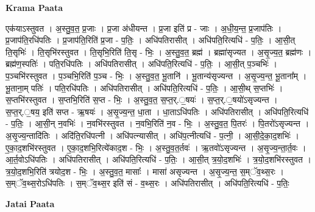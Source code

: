 \documentclass[17pt]{extarticle}
\begin{document}
\textbf{Krama Paata} \newline

एक॑याऽस्तुवत । अ॒स्तु॒व॒त॒ प्र॒जाः । प्र॒जा अ॑धीयन्त । प्र॒जा इति॑ प्र - जाः । अ॒धी॒य॒न्त॒ प्र॒जाप॑तिः । प्र॒जाप॑ति॒रधि॑पतिः । प्र॒जाप॑ति॒रिति॑ प्र॒जा - प॒तिः॒ । अधि॑पतिरासीत् । अधि॑पति॒रित्यधि॑ - प॒तिः॒ । आ॒सी॒त् ति॒सृभिः॑ । ति॒सृभि॑रस्तुवत । ति॒सृभि॒रिति॑ ति॒सृ - भिः॒ । अ॒स्तु॒व॒त॒ ब्रह्म॑ । ब्रह्मा॑सृज्यत । अ॒सृ॒ज्य॒त॒ ब्रह्म॑णः । ब्रह्म॑ण॒स्पतिः॑ । पति॒रधि॑पतिः । अधि॑पतिरासीत् । अधि॑पति॒रित्यधि॑ - प॒तिः॒ । आ॒सी॒त् प॒ञ्चभिः॑ । प॒ञ्चभि॑रस्तुवत । प॒ञ्चभि॒रिति॑ प॒ञ्च - भिः॒ । अ॒स्तु॒व॒त॒ भू॒तानि॑ । भू॒तान्य॑सृज्यन्त । अ॒सृ॒ज्य॒न्त॒ भू॒ताना᳚म् । भू॒ताना॒म् पतिः॑ । पति॒रधि॑पतिः । अधि॑पतिरासीत् । अधि॑पति॒रित्यधि॑ - प॒तिः॒ । आ॒सी॒थ् स॒प्तभिः॑ । स॒प्तभि॑रस्तुवत । स॒प्तभि॒रिति॑ स॒प्त - भिः॒ । अ॒स्तु॒व॒त॒ स॒प्त॒र्.॒षयः॑ । स॒प्त॒र्.॒षयो॑ऽसृज्यन्त । स॒प्त॒र्.॒षय॒ इति॑ सप्त - ऋ॒षयः॑ । अ॒सृ॒ज्य॒न्त॒ धा॒ता । धा॒ताऽधि॑पतिः । अधि॑पतिरासीत् । अधि॑पति॒रित्यधि॑ - प॒तिः॒ । आ॒सी॒न् न॒वभिः॑ । न॒वभि॑रस्तुवत । न॒वभि॒रिति॑ न॒व - भिः॒ । अ॒स्तु॒व॒त॒ पि॒तरः॑ । पि॒तरो॑ऽसृज्यन्त । अ॒सृ॒ज्य॒न्तादि॑तिः । अदि॑ति॒रधि॑पत्नी । अधि॑पत्न्यासीत् । अधि॑प॒त्नीत्यधि॑ - प॒त्नी॒ । आ॒सी॒दे॒का॒द॒शभिः॑ । ए॒का॒द॒शभि॑रस्तुवत । ए॒का॒द॒शभि॒रित्ये॑काद॒श - भिः॒ । अ॒स्तु॒व॒त॒र्तवः॑ । ऋ॒तवो॑ऽसृज्यन्त । अ॒सृ॒ज्य॒न्ता॒र्त॒वः । आ॒र्त॒वोऽधि॑पतिः । अधि॑पतिरासीत् । अधि॑पति॒रित्यधि॑ - प॒तिः॒ । आ॒सी॒त् त्र॒यो॒द॒शभिः॑ । त्र॒यो॒द॒शभि॑रस्तुवत । त्र॒यो॒द॒शभि॒रिति॑ त्रयोद॒श - भिः॒ । अ॒स्तु॒व॒त॒ मासाः᳚ । मासा॑ असृज्यन्त । अ॒सृ॒ज्य॒न्त॒ स॒म्ॅव॒थ्स॒रः । स॒म्ॅव॒थ्स॒रोऽधि॑पतिः । स॒म्ॅव॒थ्स॒र इति॑ सं - व॒थ्स॒रः । अधि॑पतिरासीत् । अधि॑पति॒रित्यधि॑ - प॒तिः॒ \newline

\textbf{Jatai Paata} \newline
\end{document}
